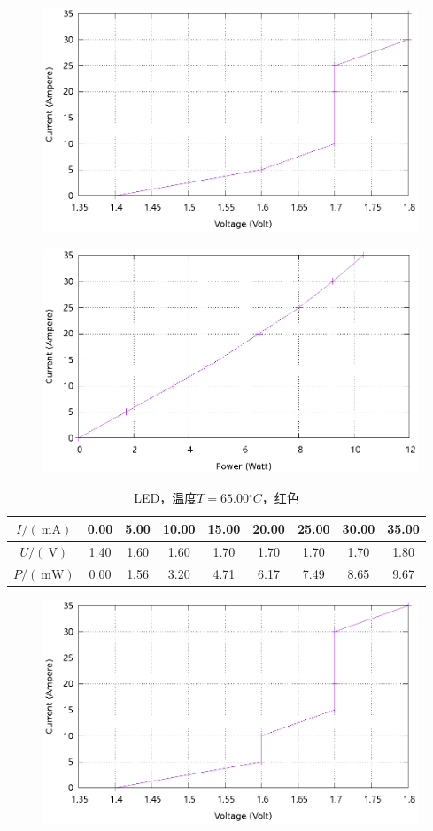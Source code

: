 \documentclass{ctexart}
\newcommand{\si}[1]{\  \mathrm{#1}}
\begin{document}
\begin{figure}[H]
    \centering
    \includegraphics[width=0.9\linewidth]{../output/led-vc-7.gnuplot}
\end{figure}
\begin{figure}[H]
    \centering
    \includegraphics[width=0.9\linewidth]{../output/led-pc-7.gnuplot}
\end{figure}
\newpage
\begin{table}[H]
    \centering
    \begin{tabular}{|c|c|c|c|c|c|c|c|c|}
        \hline
        $I/(\si{mA})$ & 0.00 & 5.00 & 10.00 & 15.00 & 20.00 & 25.00 & 30.00 & 35.00 \\\hline
        $U / (\si{V})$  & 1.40 & 1.60 & 1.60 & 1.70 & 1.70 & 1.70 & 1.70 & 1.80 \\\hline
        $P / (\si{mW})$ & 0.00 & 1.56 & 3.20 & 4.71 & 6.17 & 7.49 & 8.65 & 9.67 \\\hline
    \end{tabular}
    \caption{LED，温度$T=65.00{}^{\circ}C$，红色}
\end{table}
\begin{figure}[H]
    \centering
    \includegraphics[width=0.9\linewidth]{../output/led-vc-8.gnuplot}
\end{figure}
\end{document}
